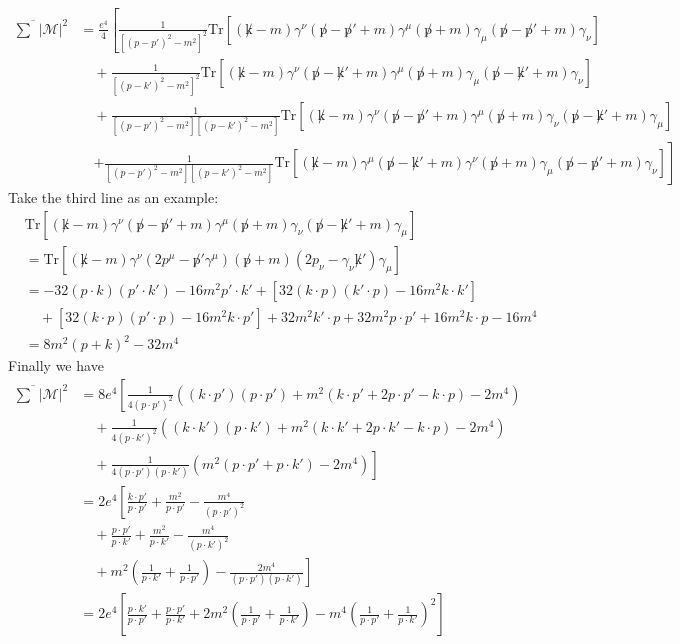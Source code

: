 \begin{equation}
\begin{aligned}
\overline{\sum}|\mathcal{M}|^2&=\frac{e^4}{4}\left[
	\frac{1}{[(p-p')^2-m^2]^2}\text{Tr}[({\not k}-m)\gamma^\nu ({\not p}-{\not p}'+m)\gamma^\mu ({\not p}+m)\gamma_{\mu}({\not p}-{\not p}'+m)\gamma_{\nu}]
	\right.
	\\
	&\quad +
	\frac{1}{[(p-k')^2-m^2]^2}\text{Tr}[({\not k}-m)\gamma^\nu ({\not p}-{\not k}'+m)\gamma^\mu ({\not p}+m)\gamma_{\mu}({\not p}-{\not k}'+m)\gamma_{\nu}]\\
	&\quad +
	\frac{1}{[(p-p')^2-m^2][(p-k')^2-m^2]} 
	\text{Tr}[({\not k}-m)\gamma^\nu ({\not p}-{\not p}'+m)\gamma^\mu ({\not p}+m)\gamma_\nu ({\not p}-{\not k}'+m)\gamma_\mu]\\
	&\quad \left.+
	\frac{1}{[(p-p')^2-m^2][(p-k')^2-m^2]}
	\text{Tr}[({\not k}-m)\gamma^\mu({\not p}-{\not k}'+m)\gamma^\nu({\not p}+m)\gamma_\mu ({\not p}-{\not p}'+m)\gamma_\nu]\right]
\end{aligned}
\end{equation}
Take the third line as an example:
\begin{equation}
\begin{aligned}
&\text{Tr}[({\not k}-m)\gamma^\nu ({\not p}-{\not p}'+m)\gamma^\mu ({\not p}+m)\gamma_\nu ({\not p}-{\not k}'+m)\gamma_\mu]
\\
&=\text{Tr}[({\not k}-m)\gamma^\nu (2p^\mu - {\not p}'\gamma^\mu)({\not p}+m)(2p_\nu-\gamma_\nu {\not k}')\gamma_\mu]\\
&=-32(p\cdot k)(p'\cdot k') -16m^2p'\cdot k'+[32(k\cdot p)(k'\cdot p)-16m^2k\cdot k']\\
&\quad +[32(k\cdot p)(p'\cdot p)-16m^2k\cdot p']
+32m^2k'\cdot p+32m^2p\cdot p'+16m^2k\cdot p-16m^4\\
&=8m^2(p+k)^2-32m^4
\end{aligned}
\end{equation}
Finally we have
\begin{equation}
\begin{aligned}
	\overline {\sum}|\mathcal{M}|^2&= 8e^4 \left[
	\frac{1}{4(p\cdot p')^2}((k\cdot p')(p\cdot p')
	+m^2(k\cdot p'+2p\cdot p'-k\cdot p)-2m^4)
	\right.\\
	&\quad +
	\frac{1}{4(p\cdot k')^2}
	((k\cdot k')(p\cdot k')
		+m^2(k\cdot k'+2p\cdot k'-k\cdot p)-2m^4)\\
	&\left.\quad +
	\frac{1}{4(p\cdot p')(p\cdot k')} 
	\left(
	m^2(p\cdot p'+p\cdot k')-2m^4
	\right)
	 \right]\\
	&= 2e^4 \left[
	\frac{k\cdot p'}{p\cdot p'}+\frac{m^2}{p\cdot p'}-\frac{m^4}{(p\cdot p')^2}\right.\\
	&\quad +\frac{p\cdot p'}{p\cdot k'}+\frac{m^2}{p\cdot k'}-\frac{m^4}{(p\cdot k')^2}\\
	&\left.\quad +
	m^2\left(\frac{1}{p\cdot k'}+\frac{1}{p\cdot p'}\right)-\frac{2m^4}{(p\cdot p')(p\cdot k')}
	\right]\\
	&=2e^4\left[\frac{p\cdot k'}{p\cdot p'}+\frac{p\cdot p'}{p\cdot k'}+2m^2\left(\frac{1}{p\cdot p'}+\frac{1}{p\cdot k'}\right)-m^4\left(\frac{1}{p\cdot p'}+\frac{1}{p\cdot k'}\right)^2\right]
\end{aligned}
\end{equation}